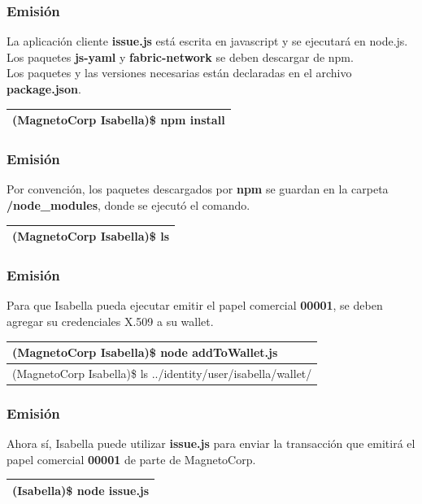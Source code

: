 \documentclass{beamer}
\begin{document}
	\begin{frame}
		\frametitle{Emisión}
		La aplicación cliente \textbf{issue.js} está escrita en javascript y se ejecutará en node.js. Los paquetes \textbf{js-yaml} y \textbf{fabric-network} se deben descargar de npm.\\
		\vspace{4mm}
		Los paquetes y las versiones necesarias están declaradas en el archivo \textbf{package.json}.
		\begin{center}
			\begin{tabulary}{\linewidth}{L}
				\hline
				(MagnetoCorp Isabella)\$ npm install \\
				\hline
			\end{tabulary} 
		\end{center}
	\end{frame}

	\begin{frame}
		\frametitle{Emisión}
		Por convención, los paquetes descargados por \textbf{npm} se guardan en la carpeta \textbf{/node\_modules}, donde se ejecutó el comando.
		\begin{center}
			\begin{tabulary}{\linewidth}{L}
				\hline
				(MagnetoCorp Isabella)\$ ls \\
				\hline
			\end{tabulary} 
		\end{center}
	\end{frame}
	
	\begin{frame}
		\frametitle{Emisión}
		Para que Isabella pueda ejecutar emitir el papel comercial \textbf{00001}, se deben agregar su credenciales X.509 a su wallet.\\
		\begin{center}
			\begin{tabulary}{\linewidth}{L}
				\hline
				(MagnetoCorp Isabella)\$ node addToWallet.js \\
				\hline
				(MagnetoCorp Isabella)\$ ls ../identity/user/isabella/wallet/ \\
				\hline
			\end{tabulary} 
		\end{center}
	\end{frame}
	
	\begin{frame}
		\frametitle{Emisión}
		Ahora sí, Isabella puede utilizar \textbf{issue.js} para enviar la transacción que emitirá el papel comercial \textbf{00001} de parte de MagnetoCorp.\\
		\begin{center}
			\begin{tabulary}{\linewidth}{L}
				\hline
				(Isabella)\$ node issue.js \\
				\hline
			\end{tabulary} 
		\end{center}
	\end{frame}
	
\end{document}
